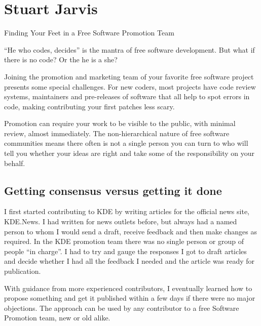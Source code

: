 
\chapter{Stuart Jarvis}{Finding Your Feet in a Free Software Promotion Team}

``He who codes, decides'' is the mantra of free software development. But what
if there is no code? Or the he is a she?

Joining the promotion and marketing team of your favorite free software project
presents some special challenges. For new coders, most projects have code review
systems, maintainers and pre-releases of software that all help to spot errors
in code, making contributing your first patches less scary. 

Promotion can require your work to be visible to the public, with minimal
review, almost immediately. The non-hierarchical nature of free software
communities means there often is not a single person you can turn to who will
tell you whether your ideas are right and take some of the responsibility on
your behalf.

\section*{Getting consensus versus getting it done}

I first started contributing to KDE by writing articles for the official news
site, KDE.News. I had written for news outlets before, but always had a named
person to whom I would send a draft, receive feedback and then make changes as
required. In the KDE promotion team there was no single person or group of
people ``in charge''. I had to try and gauge the responses I got to draft
articles and decide whether I had all the feedback I needed and the article was
ready for publication.

With guidance from more experienced contributors, I eventually learned how to
propose something and get it published within a few days if there were no major
objections. The approach can be used by any contributor to a free Software
Promotion team, new or old alike.


